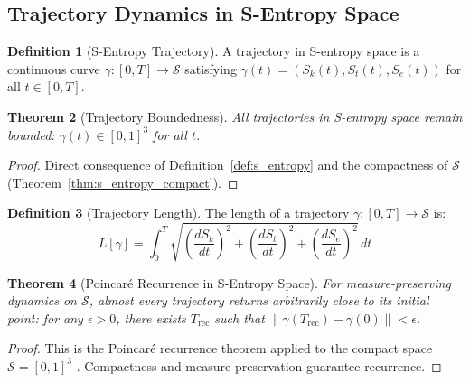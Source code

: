 \documentclass[11pt,twocolumn,a4paper]{article}
\newtheorem{theorem}{Theorem}[section]
\theoremstyle{definition}
\newtheorem{definition}[theorem]{Definition}
\theoremstyle{remark}
\newcommand{\Sspace}{\mathcal{S}}
\newcommand{\Sk}{S_k}
\newcommand{\St}{S_t}
\newcommand{\Se}{S_e}
\begin{document}
\subsection{Trajectory Dynamics in S-Entropy Space}

\begin{definition}[S-Entropy Trajectory]
\label{def:s_trajectory}
A trajectory in S-entropy space is a continuous curve $\gamma: [0,T] \to \Sspace$ satisfying $\gamma(t) = (\Sk(t), \St(t), \Se(t))$ for all $t \in [0,T]$.
\end{definition}

\begin{theorem}[Trajectory Boundedness]
\label{thm:trajectory_bounded}
All trajectories in S-entropy space remain bounded: $\gamma(t) \in [0,1]^3$ for all $t$.
\end{theorem}

\begin{proof}
Direct consequence of Definition~\ref{def:s_entropy} and the compactness of $\Sspace$ (Theorem~\ref{thm:s_entropy_compact}).
\end{proof}

\begin{definition}[Trajectory Length]
\label{def:trajectory_length}
The length of a trajectory $\gamma: [0,T] \to \Sspace$ is:
\begin{equation}
L[\gamma] = \int_0^T \sqrt{\left(\frac{d\Sk}{dt}\right)^2 + \left(\frac{d\St}{dt}\right)^2 + \left(\frac{d\Se}{dt}\right)^2} \, dt
\label{eq:trajectory_length}
\end{equation}
\end{definition}

\begin{theorem}[Poincaré Recurrence in S-Entropy Space]
\label{thm:poincare_s}
For measure-preserving dynamics on $\Sspace$, almost every trajectory returns arbitrarily close to its initial point: for any $\epsilon > 0$, there exists $T_{\mathrm{rec}}$ such that $\|\gamma(T_{\mathrm{rec}}) - \gamma(0)\| < \epsilon$.
\end{theorem}

\begin{proof}
This is the Poincaré recurrence theorem applied to the compact space $\Sspace = [0,1]^3$ \citep{poincare1890probleme,katok1995introduction}. Compactness and measure preservation guarantee recurrence.
\end{proof}
\end{document}
